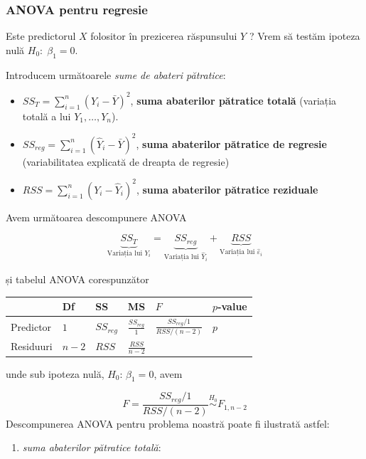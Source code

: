\documentclass[]{article}
\providecommand{\tightlist}{%
  \setlength{\itemsep}{0pt}\setlength{\parskip}{0pt}}
\begin{document}
\subsubsection{ANOVA pentru regresie}\label{anova-pentru-regresie}

Este predictorul \(X\) folositor în prezicerea răspunsului \(Y\) ? Vrem
să testăm ipoteza nulă \(H_0:\;\beta_1=0\).

Introducem următoarele \emph{sume de abateri pătratice}:

\begin{itemize}
\tightlist
\item
  \(SS_T=\sum_{i=1}^n\left(Y_i-\bar Y\right)^2\), \textbf{suma
  abaterilor pătratice totală} (variația totală a lui
  \(Y_1,\ldots,Y_n\)).
\item
  \(SS_{reg}=\sum_{i=1}^n\left(\hat Y_i-\bar Y\right)^2\), \textbf{suma
  abaterilor pătratice de regresie} (variabilitatea explicată de dreapta
  de regresie)
\item
  \(RSS=\sum_{i=1}^n\left(Y_i-\hat Y_i\right)^2\), \textbf{suma
  abaterilor pătratice reziduale}
\end{itemize}

Avem următoarea descompunere ANOVA

\[
\underbrace{SS_T}_{\text{Variația lui }Y_i} = \underbrace{SS_{reg}}_{\text{Variația lui }\hat Y_i} + \underbrace{RSS}_{\text{Variația lui }\hat \varepsilon_i} 
\]

și tabelul ANOVA corespunzător

\begin{longtable}[]{@{}llllll@{}}
\toprule
& Df & SS & MS & \(F\) & \(p\)-value\tabularnewline
\midrule
\endhead
Predictor & \(1\) & \(SS_{reg}\) & \(\frac{SS_{reg}}{1}\) &
\(\frac{SS_{reg}/1}{RSS/(n-2)}\) & \(p\)\tabularnewline
Residuuri & \(n - 2\) & \(RSS\) & \(\frac{RSS}{n-2}\) & &\tabularnewline
\bottomrule
\end{longtable}

unde sub ipoteza nulă, \(H_0:\,\beta_1 = 0\), avem

\[
  F=\frac{SS_{reg}/1}{RSS/(n-2)}\stackrel{H_0}{\sim} F_{1,n-2}
\] Descompunerea ANOVA pentru problema noastră poate fi ilustrată
astfel:

\begin{enumerate}
\def\labelenumi{\alph{enumi})}
\tightlist
\item
  \emph{suma abaterilor pătratice totală}:
\end{enumerate}
\end{document}

